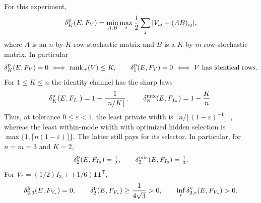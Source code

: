 \begin{proposition}\label{prop:v13-rank}
For this experiment,
\begin{equation}\label{eq:v13-factor}
 \delta^{\rm p}_K(E,F_V)=\min_{A,B}\max_i\frac12
                 \sum_j|V_{ij}-(AB)_{ij}|,
\end{equation}
where $A$ is an $n$-by-$K$ row-stochastic matrix and $B$ is a $K$-by-$m$
row-stochastic matrix. In particular
\[
 \dpr_K(E,F_V)=0\ \Longleftrightarrow\ \rplus(V)\le K,
 \qquad
 \dpr_1(E,F_V)=0\ \Longleftrightarrow\ V\text{ has identical rows}.
\]
For $1\le K\le n$ the identity channel has the sharp laws
\begin{equation}\label{eq:v13-allidentity}
 \delta^{\rm p}_K(E,F_{I_n})=1-\frac1{\lceil n/K\rceil},\qquad
 \delta^{\rm mix}_K(E,F_{I_n})=1-\frac Kn.
\end{equation}
Thus, at tolerance $0\le\varepsilon<1$, the least private width is
$\lceil n/\lfloor(1-\varepsilon)^{-1}\rfloor\rceil$, whereas the
least within-mode width with optimized hidden selection is
$\max\{1,\lceil n(1-\varepsilon)\rceil\}$. The latter still pays for
its selector. In particular, for $n=m=3$ and $K=2$,
\begin{equation}\label{eq:v13-identity}
 \delta^{\rm p}_2(E,F_{I_3})=\tfrac12,
 \qquad \delta^{\rm mix}_2(E,F_{I_3})=\tfrac13.
\end{equation}
For $V_*=(1/2)I_3+(1/6)\mathbf1\mathbf1^{\mathsf T}$,
\begin{equation}\label{eq:v13-strictzero}
 \delta^{\rm h}_{2,3}(E,F_{V_*})=0,
 \qquad \delta^{\rm p}_2(E,F_{V_*})\ge\frac1{4\sqrt3}>0,
 \qquad \inf_r\delta^{\rm v}_{2,r}(E,F_{V_*})>0.
\end{equation}
\end{proposition}
